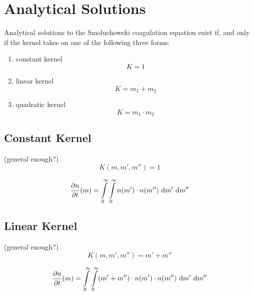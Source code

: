 

\newpage\section{Analytical Solutions}

    Analytical solutions to the Smoluchowski coagulation equation exist if, and only if the kernel
    takes on one of the following three forms:
    \begin{enumerate}
        \item constant kernel
            $$K=1$$
        \item linear kernel
            $$K=m_1+m_2$$
        \item quadratic kernel
            $$K=m_1\cdot m_2$$
    \end{enumerate}

    \subsection{Constant Kernel}

     (general enough?)
    \begin{equation}
        K(m, m', m'')
            = 1
    \end{equation}

    \begin{equation}
        \frac{\partial n}{\partial t}(m)
            = 
                \int\limits_0^\infty \int\limits_0^\infty
                n(m') \cdot n(m'')
                \ \text{d} m' \ \text{d} m''
    \end{equation}

    \subsection{Linear Kernel}

     (general enough?)
    \begin{equation}
        K(m, m', m'')
            = m' + m''
    \end{equation}

    \begin{equation}
        \frac{\partial n}{\partial t}(m)
            = 
                \int\limits_0^\infty \int\limits_0^\infty
                (m' + m'') \cdot
                n(m') \cdot n(m'')
                \ \text{d} m' \ \text{d} m''
    \end{equation}

